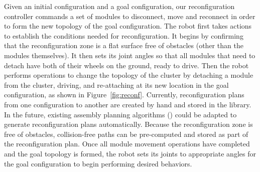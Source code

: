 \documentclass[journal]{IEEEtran}
\begin{document}
Given an initial configuration and a goal configuration, our reconfiguration controller commands a set of modules to disconnect, move and reconnect in order to form the new topology of the goal configuration. 
The robot first takes actions to establish the conditions needed for reconfiguration.  It begins by confirming that the reconfiguration zone is a flat surface free of obstacles (other than the modules themselves).
It then  sets its joint angles so that all modules that need to detach have both of their wheels on the ground, ready to drive.
Then the robot performs operations to change the topology of the cluster by detaching a module from the cluster, driving, and re-attaching at its new location in the goal configuration, as shown in Figure~\ref{fig:reconf}.
Currently, reconfiguration plans from one configuration to another are created by hand and stored in the library.  In the future, existing assembly planning algorithms (\cite{Werfel2007,Seo2013}) could be adapted to generate reconfiguration plans automatically.
Because the reconfiguration zone is free of obstacles, collision-free paths can be pre-computed and stored as part of the reconfiguration plan.
Once all module movement operations have completed and the goal topology is formed, the robot sets its joints to appropriate angles for the goal configuration to begin performing desired behaviors.


\end{document}
